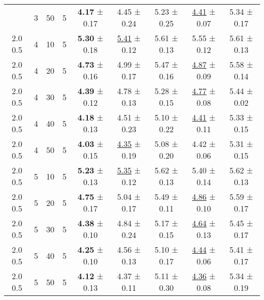 \begin{tabular}{ccccccccc}
\begin{tabular}{lllllllll}
2.0 0.5 & 3 & 50 & 5 & \textbf{4.17} ± 0.17 &             4.45 ± 0.24 & 5.23 ± 0.25 & \underline{4.41} ± 0.07 & 5.34 ± 0.17 \\
2.0 0.5 & 4 & 10 & 5 & \textbf{5.30} ± 0.18 & \underline{5.41} ± 0.12 & 5.61 ± 0.13 &             5.55 ± 0.12 & 5.61 ± 0.13 \\
2.0 0.5 & 4 & 20 & 5 & \textbf{4.73} ± 0.16 &             4.99 ± 0.17 & 5.47 ± 0.16 & \underline{4.87} ± 0.09 & 5.58 ± 0.14 \\
2.0 0.5 & 4 & 30 & 5 & \textbf{4.39} ± 0.12 &             4.78 ± 0.13 & 5.28 ± 0.15 & \underline{4.77} ± 0.08 & 5.44 ± 0.02 \\
2.0 0.5 & 4 & 40 & 5 & \textbf{4.18} ± 0.13 &             4.51 ± 0.23 & 5.10 ± 0.22 & \underline{4.41} ± 0.11 & 5.33 ± 0.15 \\
2.0 0.5 & 4 & 50 & 5 & \textbf{4.03} ± 0.15 & \underline{4.35} ± 0.19 & 5.08 ± 0.20 &             4.42 ± 0.06 & 5.31 ± 0.15 \\
2.0 0.5 & 5 & 10 & 5 & \textbf{5.23} ± 0.13 & \underline{5.35} ± 0.12 & 5.62 ± 0.13 &             5.40 ± 0.14 & 5.62 ± 0.13 \\
2.0 0.5 & 5 & 20 & 5 & \textbf{4.75} ± 0.17 &             5.04 ± 0.17 & 5.49 ± 0.11 & \underline{4.86} ± 0.10 & 5.59 ± 0.17 \\
2.0 0.5 & 5 & 30 & 5 & \textbf{4.38} ± 0.10 &             4.84 ± 0.24 & 5.17 ± 0.15 & \underline{4.64} ± 0.13 & 5.45 ± 0.17 \\
2.0 0.5 & 5 & 40 & 5 & \textbf{4.25} ± 0.10 &             4.56 ± 0.13 & 5.10 ± 0.17 & \underline{4.44} ± 0.06 & 5.41 ± 0.17 \\
2.0 0.5 & 5 & 50 & 5 & \textbf{4.12} ± 0.13 &             4.37 ± 0.11 & 5.11 ± 0.30 & \underline{4.36} ± 0.08 & 5.34 ± 0.19 \\
\bottomrule
\end{tabular}
